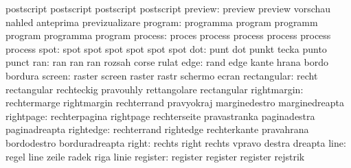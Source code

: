                            postscript                postscript
                           postscript                postscript
                  preview: preview                   preview
                           vorschau                  nahled
                           anteprima                 previzualizare
                  program: programma                 program
                           programm                  program
                           programma                 program
process: proces   process
         process  process
         process  process
   spot: spot spot
         spot spot
         spot spot
                      dot: punt                      dot
                           punkt                     tecka
                           punto                     punct
                      ran: ran                       ran
                           ran                       rozsah
                           corse                     rulat
                     edge: rand                      edge
                           kante                     hrana
                           bordo                     bordura
                   screen: raster                    screen
                           raster                    rastr
                           schermo                   ecran
              rectangular: recht                     rectangular
                           rechteckig                pravouhly
                           rettangolare              rectangular
              rightmargin: rechtermarge              rightmargin
                           rechterrand               pravyokraj
                           marginedestro             marginedreapta
                rightpage: rechterpagina             rightpage
                           rechterseite              pravastranka
                           paginadestra              paginadreapta
                rightedge: rechterrand               rightedge
                           rechterkante              pravahrana
                           bordodestro               borduradreapta
                    right: rechts                    right
                           rechts                    vpravo
                           destra                    dreapta
                     line: regel                     line
                           zeile                     radek
                           riga                      linie
                 register: register                  register
                           register                  rejstrik
